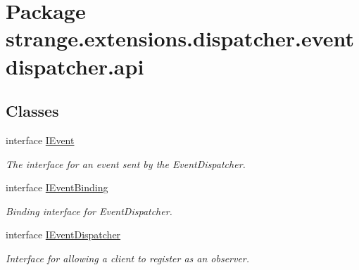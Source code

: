 \hypertarget{namespacestrange_1_1extensions_1_1dispatcher_1_1eventdispatcher_1_1api}{\section{Package strange.\-extensions.\-dispatcher.\-eventdispatcher.\-api}
\label{namespacestrange_1_1extensions_1_1dispatcher_1_1eventdispatcher_1_1api}
}
\subsection*{Classes}
\begin{DoxyCompactItemize}
\item 
interface \hyperlink{interfacestrange_1_1extensions_1_1dispatcher_1_1eventdispatcher_1_1api_1_1_i_event}{I\-Event}
\begin{DoxyCompactList}\small\item\em The interface for an event sent by the Event\-Dispatcher. \end{DoxyCompactList}\item 
interface \hyperlink{interfacestrange_1_1extensions_1_1dispatcher_1_1eventdispatcher_1_1api_1_1_i_event_binding}{I\-Event\-Binding}
\begin{DoxyCompactList}\small\item\em Binding interface for Event\-Dispatcher. \end{DoxyCompactList}\item 
interface \hyperlink{interfacestrange_1_1extensions_1_1dispatcher_1_1eventdispatcher_1_1api_1_1_i_event_dispatcher}{I\-Event\-Dispatcher}
\begin{DoxyCompactList}\small\item\em Interface for allowing a client to register as an observer. \end{DoxyCompactList}\end{DoxyCompactItemize}
